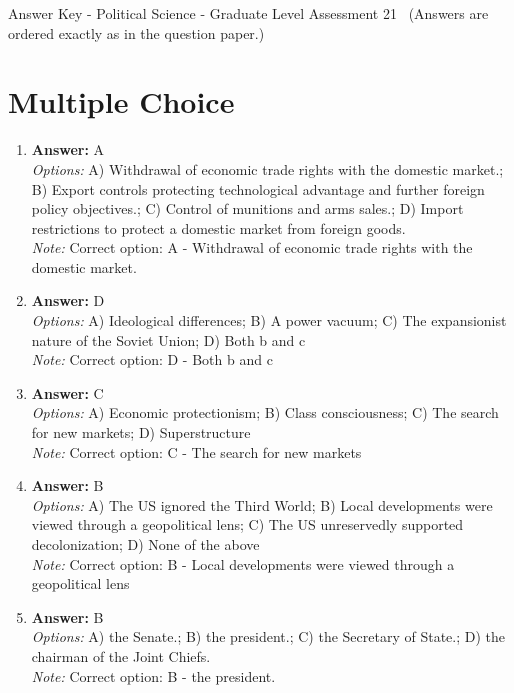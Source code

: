 \documentclass[12pt]{article}
\begin{document}
\begin{center}
Answer Key - Political Science - Graduate Level Assessment 21 \
\small (Answers are ordered exactly as in the question paper.)
\end{center}

\section*{Multiple Choice}
\begin{enumerate}[label=\arabic*.]
\item \textbf{Answer:} A
\\ \textit{Options:} A) Withdrawal of economic trade rights with the domestic market.; B) Export controls protecting technological advantage and further foreign policy objectives.; C) Control of munitions and arms sales.; D) Import restrictions to protect a domestic market from foreign goods.
\\ \textit{Note:} Correct option: A - Withdrawal of economic trade rights with the domestic market.
\item \textbf{Answer:} D
\\ \textit{Options:} A) Ideological differences; B) A power vacuum; C) The expansionist nature of the Soviet Union; D) Both b and c
\\ \textit{Note:} Correct option: D - Both b and c
\item \textbf{Answer:} C
\\ \textit{Options:} A) Economic protectionism; B) Class consciousness; C) The search for new markets; D) Superstructure
\\ \textit{Note:} Correct option: C - The search for new markets
\item \textbf{Answer:} B
\\ \textit{Options:} A) The US ignored the Third World; B) Local developments were viewed through a geopolitical lens; C) The US unreservedly supported decolonization; D) None of the above
\\ \textit{Note:} Correct option: B - Local developments were viewed through a geopolitical lens
\item \textbf{Answer:} B
\\ \textit{Options:} A) the Senate.; B) the president.; C) the Secretary of State.; D) the chairman of the Joint Chiefs.
\\ \textit{Note:} Correct option: B - the president.
\end{enumerate}
\end{document}
